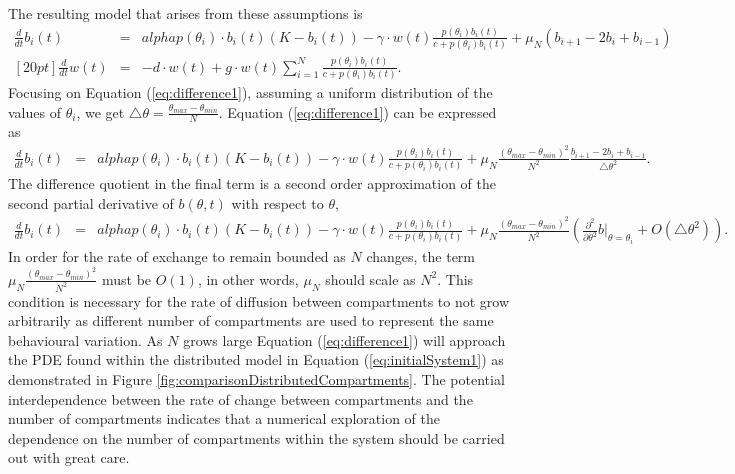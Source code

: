\documentclass[review,authoryear]{elsarticle}
\def\alpha{alpha}%
\newcommand{\origB}{{b}}
\newcommand{\origW}{{w}}
\newcommand{\origAlpha}{{\alpha}}
\newcommand{\origK}{{K}}
\newcommand{\origGamma}{{\gamma}}
\newcommand{\origC}{{c}}
\newcommand{\origD}{{d}}
\newcommand{\origG}{{g}}
\newcommand{\origT}{{t}}
\begin{document}
The resulting model that arises from these assumptions is 
\begin{eqnarray}
  \label{eq:difference1}
  \frac{d}{d\origT} \origB_i(\origT) & = & \origAlpha p(\theta_i) \cdot \origB_i(\origT) (\origK - \origB_i(\origT))
  - \origGamma \cdot \origW(\origT) \frac{p(\theta_i)\origB_i(\origT)}{\origC+p(\theta_i)\origB_i(\origT)} 
  + \mu_N \left( \origB_{i+1}-2\origB_i + \origB_{i-1} \right) \\ [20pt]
  \label{eq:difference2}
  \frac{d}{d\origT} \origW(\origT) & = & -\origD \cdot \origW(\origT) + \origG \cdot \origW(\origT)
  \sum^N_{i=1} \frac{p(\theta_i)\origB_i(\origT)}{\origC+p(\theta_i)\origB_i(\origT)}.
\end{eqnarray}
Focusing on Equation (\ref{eq:difference1}), assuming a uniform distribution of the values of $\theta_i$, we get $\triangle\theta=\frac{\theta_{max}-\theta_{min}}{N}$. Equation (\ref{eq:difference1}) can be expressed as
\begin{eqnarray}
  \frac{d}{d\origT} \origB_i(\origT) & = & \origAlpha p(\theta_i) \cdot \origB_i(\origT) (\origK - \origB_i(\origT))
  - \origGamma \cdot \origW(\origT) \frac{p(\theta_i)\origB_i(\origT)}{\origC+p(\theta_i)\origB_i(\origT)} 
  + \mu_N \frac{(\theta_{max}-\theta_{min})^2}{N^2} \frac{ \origB_{i+1}-2\origB_i + \origB_{i-1}}{\triangle\theta^2}.
\end{eqnarray}
The difference quotient in the final term is a second order approximation of the second partial derivative of $\origB(\theta,t)$ with respect to $\theta$,
\begin{eqnarray}
  \frac{d}{d\origT} \origB_i(\origT) & = & \origAlpha p(\theta_i) \cdot \origB_i(\origT) (\origK - \origB_i(\origT))
  - \origGamma \cdot \origW(\origT) \frac{p(\theta_i)\origB_i(\origT)}{\origC+p(\theta_i)\origB_i(\origT)} 
  + \mu_N \frac{(\theta_{max} - \theta_{min})^2}{N^2} \left( \frac{\partial^2}{\partial\theta^2} b \bigg|_{\theta=\theta_i} + O(\triangle\theta^2)\right).
\end{eqnarray}
In order for the rate of exchange to remain bounded as $N$ changes, the term $\mu_N \frac{(\theta_{max}-\theta_{min})^2}{N^2}$ must be $O(1)$, in other words, $\mu_N$ should scale as $N^2$. This condition is necessary for the rate of diffusion between compartments to not grow arbitrarily as different number of compartments are used to represent the same behavioural variation.
As $N$ grows large Equation (\ref{eq:difference1}) will approach the PDE found within the distributed model in Equation (\ref{eq:initialSystem1}) as demonstrated in Figure \ref{fig:comparisonDistributedCompartments}. The potential interdependence between the rate of change between compartments and the number of compartments indicates that a numerical exploration of the dependence on the number of compartments within the system should be carried out with great care.
\end{document}
